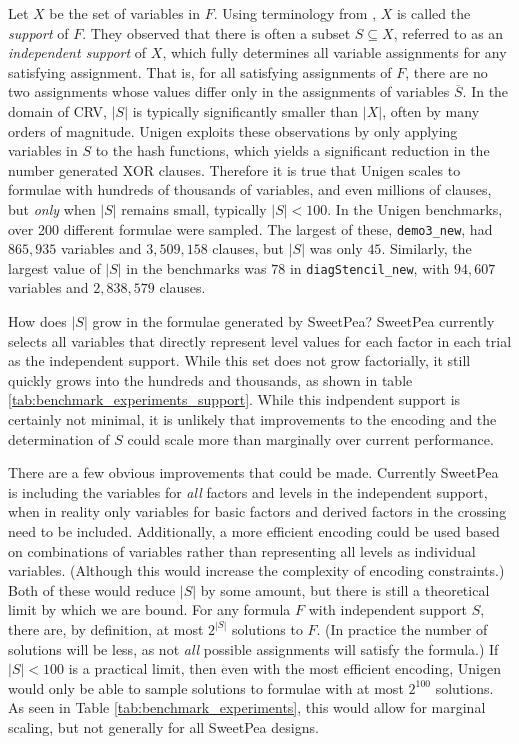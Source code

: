 Let $X$ be the set of variables in $F$. Using terminology from \cite{chakraborty_balancing_2014}, $X$ is called the \textit{support} of $F$. They observed that there is often a subset $S \subseteq X$, referred to as an \textit{independent support} of $X$, which fully determines all variable assignments for any satisfying assignment. That is, for all satisfying assignments of $F$, there are no two assignments whose values differ only in the assignments of variables $\overline{S}$. In the domain of CRV, $|S|$ is typically significantly smaller than $|X|$, often by many orders of magnitude. Unigen exploits these observations by only applying variables in $S$ to the hash functions, which yields a significant reduction in the number generated XOR clauses. Therefore it is true that Unigen scales to formulae with hundreds of thousands of variables, and even millions of clauses, but \textit{only} when $|S|$ remains small, typically $|S| < 100$. In the Unigen benchmarks, over 200 different formulae were sampled. The largest of these, \texttt{demo3\_new}, had $865,935$ variables and $3,509,158$ clauses, but $|S|$ was only $45$. Similarly, the largest value of $|S|$ in the benchmarks was $78$ in \texttt{diagStencil\_new}, with $94,607$ variables and $2,838,579$ clauses. \cite{chakraborty_parallel_2015}

How does $|S|$ grow in the formulae generated by SweetPea? SweetPea currently selects all variables that directly represent level values for each factor in each trial as the independent support. While this set does not grow factorially, it still quickly grows into the hundreds and thousands, as shown in table \ref{tab:benchmark_experiments_support}. While this indpendent support is certainly not minimal, it is unlikely that improvements to the encoding and the determination of $S$ could scale more than marginally over current performance.

There are a few obvious improvements that could be made. Currently SweetPea is including the variables for \textit{all} factors and levels in the independent support, when in reality only variables for basic factors and derived factors in the crossing need to be included. Additionally, a more efficient encoding could be used based on combinations of variables rather than representing all levels as individual variables. (Although this would increase the complexity of encoding constraints.) Both of these would reduce $|S|$ by some amount, but there is still a theoretical limit by which we are bound. For any formula $F$ with independent support $S$, there are, by definition, at most $2^{|S|}$ solutions to $F$. (In practice the number of solutions will be less, as not \textit{all} possible assignments will satisfy the formula.) If $|S| < 100$ is a practical limit, then even with the most efficient encoding, Unigen would only be able to sample solutions to formulae with at most $2^{100}$ solutions. As seen in Table \ref{tab:benchmark_experiments}, this would allow for marginal scaling, but not generally for all SweetPea designs.

